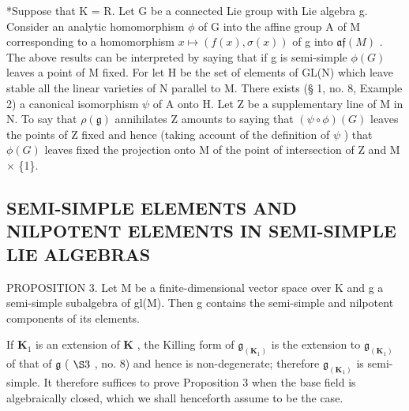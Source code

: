 *Suppose that K = R. Let G be a connected Lie group with Lie algebra g. Consider an analytic homomorphism \(\phi\) of G into the affine group A of M corresponding to a homomorphism \(x \mapsto (f(x), \sigma(x))\) of g into \(\mathfrak{af}(M)\) . The above results can be interpreted by saying that if g is semi-simple \(\phi(G)\) leaves a point of M fixed. For let H be the set of elements of GL(N) which leave stable all the linear varieties of N parallel to M. There exists (§ 1, no. 8, Example 2) a canonical isomorphism \(\psi\) of A onto H. Let Z be a supplementary line of M in N. To say that \(\rho(\mathfrak{g})\) annihilates Z amounts to saying that \((\psi \circ \phi)(G)\) leaves the points of Z fixed and hence (taking account of the definition of \(\psi\) ) that \(\phi(G)\) leaves fixed the projection onto M of the point of intersection of Z and M × \{1\}.

\subsection{SEMI-SIMPLE ELEMENTS AND NILPOTENT ELEMENTS IN SEMI-SIMPLE LIE ALGEBRAS}

PROPOSITION 3. Let M be a finite-dimensional vector space over K and g a semi-simple subalgebra of gl(M). Then g contains the semi-simple and nilpotent components of its elements.

If \(\mathbf{K}_1\) is an extension of \(\mathbf{K}\) , the Killing form of \(\mathfrak{g}_{(\mathbf{K}_1)}\) is the extension to \(\mathfrak{g}_{(\mathbf{K}_1)}\) of that of \(\mathfrak{g}\) ( \(\S 3\) , no. 8) and hence is non-degenerate; therefore \(\mathfrak{g}_{(\mathbf{K}_1)}\) is semi-simple. It therefore suffices to prove Proposition 3 when the base field is algebraically closed, which we shall henceforth assume to be the case.

